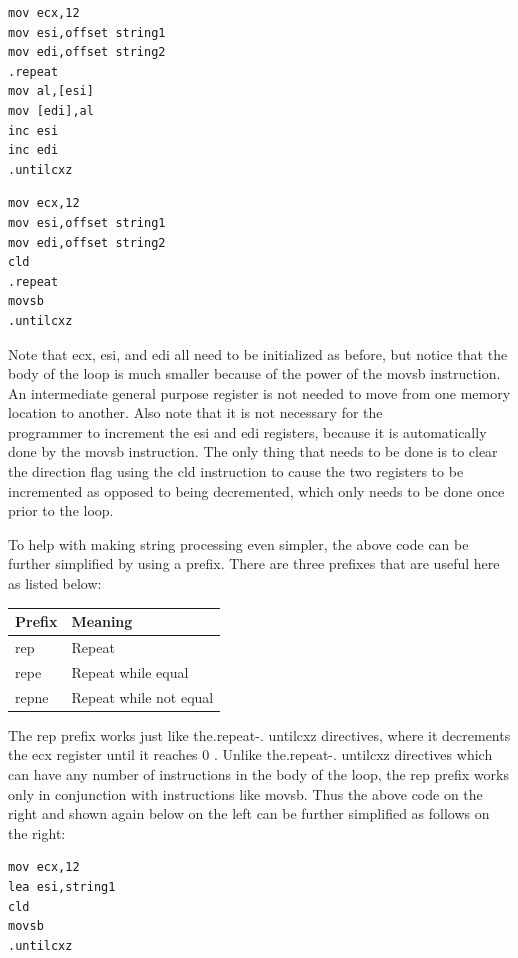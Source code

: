 \documentclass[10pt]{book}
\begin{document}
\begin{verbatim}
mov ecx,12
mov esi,offset string1
mov edi,offset string2
.repeat
mov al,[esi]
mov [edi],al
inc esi
inc edi
.untilcxz
\end{verbatim}

\begin{verbatim}
mov ecx,12
mov esi,offset string1
mov edi,offset string2
cld
.repeat
movsb
.untilcxz
\end{verbatim}

Note that ecx, esi, and edi all need to be initialized as before, but notice that the body of the loop is much smaller because of the power of the movsb instruction. An intermediate general purpose register is not needed to move from one memory location to another. Also note that it is not necessary for the\\
programmer to increment the esi and edi registers, because it is automatically done by the movsb instruction. The only thing that needs to be done is to clear the direction flag using the cld instruction to cause the two registers to be incremented as opposed to being decremented, which only needs to be done once prior to the loop.

To help with making string processing even simpler, the above code can be further simplified by using a prefix. There are three prefixes that are useful here as listed below:

\begin{center}
\begin{tabular}{|l|l|}
\hline
Prefix & Meaning \\
\hline
rep & Repeat \\
\hline
repe & Repeat while equal \\
\hline
repne & Repeat while not equal \\
\hline
\end{tabular}
\end{center}

The rep prefix works just like the.repeat-. untilcxz directives, where it decrements the ecx register until it reaches 0 . Unlike the.repeat-. untilcxz directives which can have any number of instructions in the body of the loop, the rep prefix works only in conjunction with instructions like movsb. Thus the above code on the right and shown again below on the left can be further simplified as follows on the right:

\begin{verbatim}
mov ecx,12
lea esi,string1
cld
movsb
.untilcxz
\end{verbatim}
\end{document}
